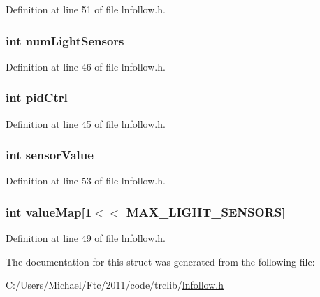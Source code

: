 Definition at line 51 of file lnfollow.h.

\hypertarget{struct_l_n_f_o_l_l_o_w_a8168f868c59bfaa91277302a4647ede1}{
\subsubsection[{numLightSensors}]{\setlength{\rightskip}{0pt plus 5cm}int {\bf numLightSensors}}}
\label{struct_l_n_f_o_l_l_o_w_a8168f868c59bfaa91277302a4647ede1}


Definition at line 46 of file lnfollow.h.

\hypertarget{struct_l_n_f_o_l_l_o_w_a545e56e258124a570f3243d01f73bd75}{
\subsubsection[{pidCtrl}]{\setlength{\rightskip}{0pt plus 5cm}int {\bf pidCtrl}}}
\label{struct_l_n_f_o_l_l_o_w_a545e56e258124a570f3243d01f73bd75}


Definition at line 45 of file lnfollow.h.

\hypertarget{struct_l_n_f_o_l_l_o_w_abc6f4a0d968d01ae532d5df65e89439b}{
\subsubsection[{sensorValue}]{\setlength{\rightskip}{0pt plus 5cm}int {\bf sensorValue}}}
\label{struct_l_n_f_o_l_l_o_w_abc6f4a0d968d01ae532d5df65e89439b}


Definition at line 53 of file lnfollow.h.

\hypertarget{struct_l_n_f_o_l_l_o_w_a1f4934508ec19f8380f33b27397fbb53}{
\subsubsection[{valueMap}]{\setlength{\rightskip}{0pt plus 5cm}int {\bf valueMap}\mbox{[}1$<$$<$ MAX\_\-LIGHT\_\-SENSORS\mbox{]}}}
\label{struct_l_n_f_o_l_l_o_w_a1f4934508ec19f8380f33b27397fbb53}


Definition at line 49 of file lnfollow.h.



The documentation for this struct was generated from the following file:\begin{DoxyCompactItemize}
\item 
C:/Users/Michael/Ftc/2011/code/trclib/\hyperlink{lnfollow_8h}{lnfollow.h}\end{DoxyCompactItemize}
